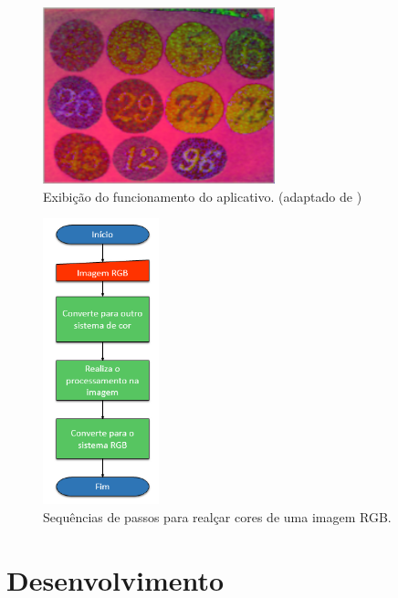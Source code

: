 \documentclass[	12pt, Times, openright, twoside, a4paper, english, brazil]{abntex2}
\begin{document}
\begin{figure}[!htb]
\centering \includegraphics[width=0.6\textwidth]{figureChromophore.png}
\caption{Exibição do funcionamento do aplicativo. (adaptado de ) \label{fig:figuraChromophore}}
\end{figure}

\begin{figure}[!htb]
\centering \includegraphics[width=0.30\textwidth]{figuraFluxoCorrecao.PNG}
\caption{Sequências de passos para realçar cores de uma imagem RGB. \label{fig:figFluxoCorrecao}}
\end{figure}

% 

\chapter{Desenvolvimento}
\label{chap:desenvolvimento}
\end{document}
